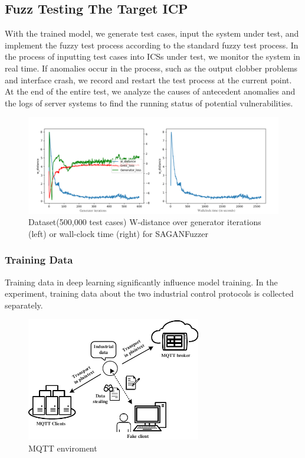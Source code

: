 \subsection{Fuzz Testing The Target ICP}
With the trained model, we generate test cases, input the system under test, and implement the fuzzy test process according to the standard fuzzy test process. In the process of inputting test cases into ICSs under test, we monitor the system in real time. If anomalies occur in the process, such as the output clobber problems and interface crash, we record and restart the test process at the current point. At the end of the entire test, we analyze the causes of antecedent anomalies and the logs of server systems to find the running status of potential vulnerabilities.

\begin{figure}[htbp] 		 %
	\centering
	\includegraphics[width=5.5in]{FigModelW-distance.pdf}
	\caption{Dataset(500,000 test cases) W-distance over generator iterations (left) or wall-clock time (right) for SAGANFuzzer}
	\label{FigModelW-distance}
\end{figure} 

\subsubsection{Training Data}
Training data in deep learning significantly influence model training. In the experiment, training data about the two industrial control protocols is collected separately. 

\begin{figure}[htbp]   %
	\centering 
	\includegraphics[width=3in]{FigMQTTEnvironment.pdf}
	\caption{MQTT enviroment}
	\label{FigMQTTEnvironment}
\end{figure}

